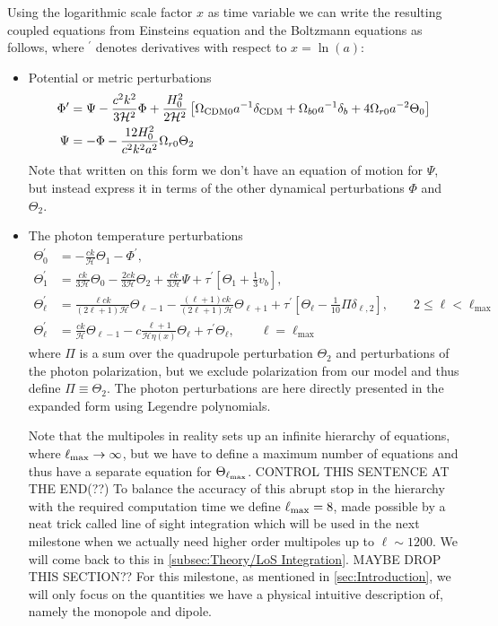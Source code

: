 \documentclass[10pt,a4paper]{article}
\begin{document}
Using the logarithmic scale factor $x$ as time variable we can write the resulting coupled equations from Einsteins equation and the Boltzmann equations as follows, where $^\prime$ denotes derivatives with respect to $x = \ln(a)$:
\begin{itemize}
\item Potential or metric perturbations
\begin{align}
  \Phi^\prime &= \Psi - \frac{c^2k^2}{3\mathcal{H}^2} \Phi + \frac{H_0^2}{2\mathcal{H}^2}
  \left[\Omega_{\rm CDM 0} a^{-1} \delta_{\rm CDM} + \Omega_{b0} a^{-1} \delta_b + 4\Omega_{r0}
  a^{-2}\Theta_0\right] \\
  \Psi &= -\Phi - \frac{12H_0^2}{c^2k^2a^2}\Omega_{r0}\Theta_2 \label{eq:Psi}
\end{align}%
Note that written on this form we don't have an equation of motion for $\Psi$, but instead express it in terms of the other dynamical perturbations $\Phi$ and $\Theta_2$.

\item The photon temperature perturbations
\begin{align}
  \Theta^\prime_0 &= -\frac{ck}{\mathcal{H}} \Theta_1 - \Phi^\prime,
  \\
  \Theta^\prime_1 &=  \frac{ck}{3\mathcal{H}} \Theta_0 - \frac{2ck}{3\mathcal{H}}\Theta_2 +
  \frac{ck}{3\mathcal{H}}\Psi + \tau^\prime\left[\Theta_1 + \frac{1}{3}v_b\right],
  \label{eq:dipole ODE}
  \\
  \Theta^\prime_\ell &= \frac{\ell ck}{(2\ell+1)\mathcal{H}}\Theta_{\ell-1} - \frac{(\ell+1)ck}{(2\ell+1)\mathcal{H}}
  \Theta_{\ell+1} + \tau^\prime\left[\Theta_\ell - \frac{1}{10}\Pi
  \delta_{\ell,2}\right], \quad\quad 2 \leq \ell < \ell_{\textrm{max}}
  \\
  \Theta_{\ell}^\prime &= \frac{ck}{\mathcal{H}}
  \Theta_{\ell-1}-c\frac{\ell+1}{\mathcal{H}\eta(x)}\Theta_\ell+\tau^\prime\Theta_\ell,
  \quad\quad \ell = \ell_{\textrm{max}}
\end{align}
where $\Pi$ is a sum over the quadrupole perturbation $\Theta_2$ and perturbations of the photon polarization, but we exclude polarization from our model and thus define $\Pi \equiv \Theta_2$. The photon perturbations are here directly presented in the expanded form using Legendre polynomials.

Note that the multipoles in reality sets up an infinite hierarchy of equations, where $\ell_{\rm{max}} \rightarrow \infty$, but we have to define a maximum number of equations and thus have a separate equation for $\Theta_{\ell_{\rm{max}}}$. CONTROL THIS SENTENCE AT THE END(??) 
To balance the accuracy of this abrupt stop in the hierarchy with the required computation time we define $\ell_{\rm{max}}=8$, made possible by a neat trick called line of sight integration which will be used in the next milestone when we actually need higher order multipoles up to $\ell \sim 1200$. We will come back to this in \cref{subsec:Theory/LoS Integration}. MAYBE DROP THIS SECTION?? For this milestone, as mentioned in \cref{sec:Introduction}, we will only focus on the quantities we have a physical intuitive description of, namely the monopole and dipole.


\end{itemize}
\end{document}
